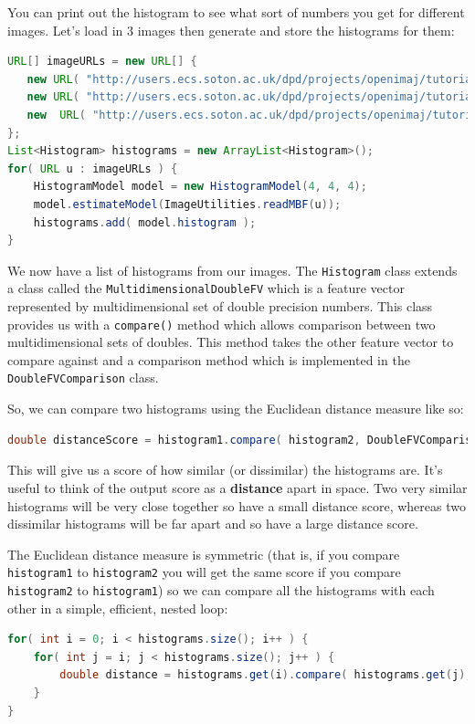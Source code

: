 \documentclass[10pt,a4paper,twoside,extrafontsizes]{memoir}
\begin{document}
You can print out the histogram to see what sort of numbers you get for different images. 
Let's load in 3 images then generate and store the histograms for them:
\begin{lstlisting}[language=java]
URL[] imageURLs = new URL[] {
   new URL( "http://users.ecs.soton.ac.uk/dpd/projects/openimaj/tutorial/hist1.jpg" ),
   new URL( "http://users.ecs.soton.ac.uk/dpd/projects/openimaj/tutorial/hist2.jpg" ), 
   new  URL( "http://users.ecs.soton.ac.uk/dpd/projects/openimaj/tutorial/hist3.jpg" ) 
};
List<Histogram> histograms = new ArrayList<Histogram>();
for( URL u : imageURLs ) {
    HistogramModel model = new HistogramModel(4, 4, 4);
    model.estimateModel(ImageUtilities.readMBF(u));
    histograms.add( model.histogram );
}
\end{lstlisting}
We now have a list of histograms from our images.  The \verb+Histogram+ class extends a 
class called the \verb+MultidimensionalDoubleFV+ which is a feature vector represented 
by multidimensional set of double precision numbers.  This class provides us with a 
\verb+compare()+ method which allows comparison between two multidimensional sets of 
doubles. This method takes the other feature vector to compare against and a comparison 
method which is implemented in the \verb+DoubleFVComparison+ class.

So, we can compare two histograms using the Euclidean distance measure like so:
\begin{lstlisting}[language=java]
double distanceScore = histogram1.compare( histogram2, DoubleFVComparison.EUCLIDEAN );
\end{lstlisting}
This will give us a score of how similar (or dissimilar) the histograms are. It's useful
to think of the output score as a \textbf{distance} apart in space. Two very similar histograms 
will be very close together so have a small distance score, whereas two dissimilar 
histograms will be far apart and so have a large distance score.

The Euclidean distance measure is symmetric (that is, if you compare \verb+histogram1+ to 
\verb+histogram2+ you will get the same score if you compare \verb+histogram2+ to 
\verb+histogram1+) so we can compare all the histograms with each other in a simple, 
efficient, nested loop:
\begin{lstlisting}[language=java]
for( int i = 0; i < histograms.size(); i++ ) {
    for( int j = i; j < histograms.size(); j++ ) {
        double distance = histograms.get(i).compare( histograms.get(j), DoubleFVComparison.EUCLIDEAN );
    }
}
\end{lstlisting}
\end{document}
